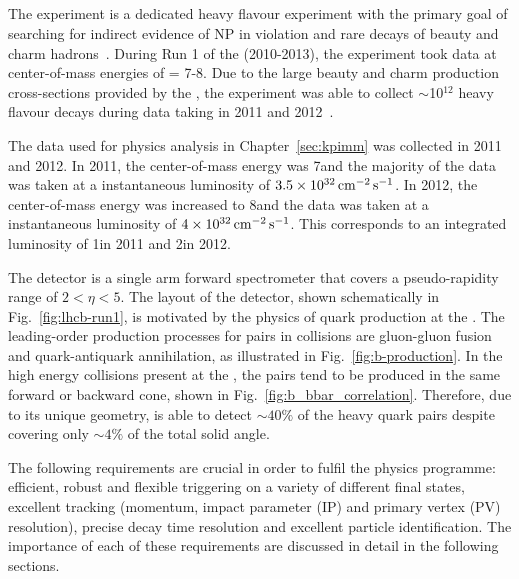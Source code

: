 \subsection{\lhcb}
\label{sec:lhcb:lhcb}

The \lhcb experiment is a dedicated heavy flavour experiment with the primary goal of searching for indirect evidence of NP in \CP violation and rare decays of beauty and charm hadrons~\cite{lhcb}. During Run 1 of the \lhc (2010-2013), the \lhcb experiment took data at center-of-mass energies of \sqs = 7-8\tev. Due to the large beauty and charm production cross-sections provided by the \lhc, the \lhcb experiment was able to collect $\sim$10$^{12}$ heavy flavour decays during data taking in 2011 and 2012~\cite{LHCb-DP-2014-002}.

The data used for physics analysis in Chapter~\ref{sec:kpimm} was collected in 2011 and 2012. In 2011, the center-of-mass energy was 7\tev and the majority of the data was taken at a instantaneous luminosity of $3.5\times10^{32}\mathrm{ \,cm}^{-2}\mathrm{{\,s}}^{-1}$. In 2012, the center-of-mass energy was increased to 8\tev and the data was taken at a instantaneous luminosity of $4\times10^{32}\mathrm{ \,cm}^{-2}\mathrm{{\,s}}^{-1}$. This corresponds to an integrated luminosity of 1\invfb in 2011 and 2\invfb in 2012.

The \lhcb detector is a single arm forward spectrometer that covers a pseudo-rapidity range of $2 < \eta < 5$. The layout of the \lhcb detector, shown schematically in Fig.~\ref{fig:lhcb-run1}, is motivated by the physics of \bquark quark production at the \lhc. The leading-order production processes for \bquark\bquarkbar pairs in \proton\proton collisions are gluon-gluon fusion and quark-antiquark annihilation, as illustrated in Fig.~\ref{fig:b-production}. In the high energy collisions present at the \lhc, the \bquark\bquarkbar pairs tend to be produced in the same forward or backward cone, shown in Fig.~\ref{fig:b_bbar_correlation}.  Therefore, due to its unique geometry, \lhcb is able to detect $\sim40\%$ of the heavy quark pairs despite covering only $\sim4\%$ of the total solid angle.

The following requirements are crucial in order to fulfil the \lhcb physics programme: efficient, robust and flexible triggering on a variety of different final states, excellent tracking (momentum, impact parameter (IP) and primary vertex (PV) resolution), precise decay time resolution and excellent particle identification. The importance of each of these requirements are discussed in detail in the following sections.

